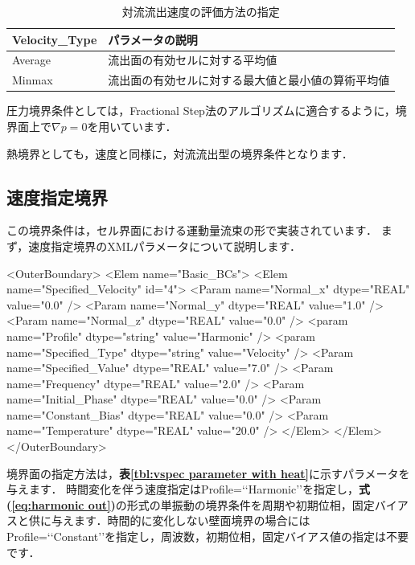 \begin{table}[htdp]
\caption{対流流出速度の評価方法の指定}
\begin{center}
\small
\begin{tabular}{ll} \toprule
Velocity\_Type & パラメータの説明\\ \midrule
Average & 流出面の有効セルに対する平均値\\
Minmax & 流出面の有効セルに対する最大値と最小値の算術平均値\\ \bottomrule
\end{tabular}
\end{center}
\label{tbl:outflow velocity}
\end{table}

圧力境界条件としては，Fractional Step法のアルゴリズムに適合するように，境界面上で$\nabla p=0$を用いています．

熱境界としても，速度と同様に，対流流出型の境界条件となります．



\pagebreak
\subsection{速度指定境界}

この境界条件は，セル界面における運動量流束の形で実装されています．
まず，速度指定境界のXMLパラメータについて説明します．

{\small
\begin{program}
<OuterBoundary>
  <Elem name="Basic_BCs">
    <Elem name="Specified_Velocity" id="4">
      <Param name="Normal_x"        dtype="REAL"   value="0.0" />
      <Param name="Normal_y"        dtype="REAL"   value="1.0" />
      <Param name="Normal_z"        dtype="REAL"   value="0.0" />
      <param name="Profile"         dtype="string" value="Harmonic" />
      <param name="Specified_Type"  dtype="string" value="Velocity" />
      <Param name="Specified_Value" dtype="REAL"   value="7.0" />
      <Param name="Frequency"       dtype="REAL"   value="2.0" />
      <Param name="Initial_Phase"   dtype="REAL"   value="0.0" />
      <Param name="Constant_Bias"   dtype="REAL"   value="0.0" />
      <Param name="Temperature"     dtype="REAL"   value="20.0" />
    </Elem>
  </Elem>
</OuterBoundary>
\end{program}
}

\noindent 境界面の指定方法は，\textbf{表\ref{tbl:vspec parameter with heat}}に示すパラメータを与えます．
時間変化を伴う速度指定はProfile=\lq\lq Harmonic\rq\rq を指定し，\textbf{式(\ref{eq:harmonic out})}の形式の単振動の境界条件を周期や初期位相，固定バイアスと供に与えます．時間的に変化しない壁面境界の場合にはProfile=\lq\lq Constant\rq\rq を指定し，周波数，初期位相，固定バイアス値の指定は不要です．


